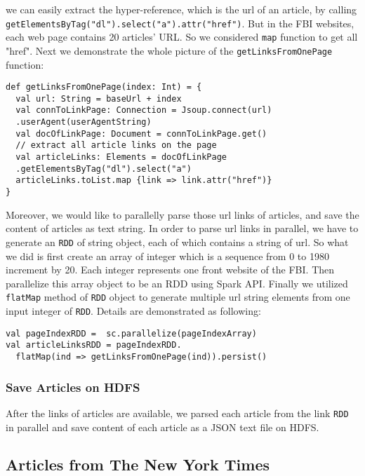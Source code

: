 we can easily extract the hyper-reference, which is the url of an article, by 
calling \texttt{getElementsByTag("dl").select("a").attr("href")}. But in the FBI
websites, each web page contains 20 articles' URL. So we considered \texttt{map}
function to get all "href". Next we demonstrate the whole picture of the 
\texttt{getLinksFromOnePage} function:
\begin{framed}
\begin{center}
\begin{verbatim}
def getLinksFromOnePage(index: Int) = {
  val url: String = baseUrl + index
  val connToLinkPage: Connection = Jsoup.connect(url)
  .userAgent(userAgentString)
  val docOfLinkPage: Document = connToLinkPage.get()
  // extract all article links on the page
  val articleLinks: Elements = docOfLinkPage
  .getElementsByTag("dl").select("a")
  articleLinks.toList.map {link => link.attr("href")}
}
\end{verbatim}
\end{center}
\end{framed}

Moreover, we would like to parallelly parse those url links of articles, and 
save the content of articles as text string. In order to parse url links in 
parallel, we have to generate an \texttt{RDD} of string object, each of which 
contains a string of url. So what we did is first create an array of integer 
which is a sequence from 0 to 1980 increment by 20. Each integer represents one 
front website of the FBI. Then parallelize this array object to be an RDD using 
Spark API. Finally we utilized \texttt{flatMap} method of \texttt{RDD} object to 
generate multiple url string elements from one input integer of \texttt{RDD}. 
Details are demonstrated as
following:
\begin{framed}
\begin{center}
\begin{verbatim}
val pageIndexRDD =  sc.parallelize(pageIndexArray)
val articleLinksRDD = pageIndexRDD.
  flatMap(ind => getLinksFromOnePage(ind)).persist()
\end{verbatim}
\end{center}
\end{framed}

\subsubsection{Save Articles on HDFS}

After the links of articles are available, we parsed each article from the link
\texttt{RDD} in parallel and save content of each article as a JSON text file on 
HDFS.

\subsection{Articles from The New York Times}